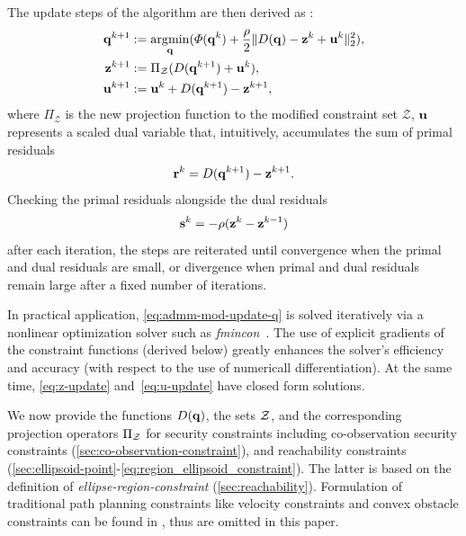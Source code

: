 \documentclass[10pt,twocolumn,twoside]{IEEEtran}
\newcommand{\news}{\color{blue}}
\begin{document}
The update steps of the algorithm are then derived as \cite{Boyd2011}:
\begin{subequations}\label{eq:ADMMupdate}
	\begin{align}
		\mathbf{q}^{k+1}&:=\operatorname*{\arg\!\min}_{\mathbf{q}}(\varPhi(\mathbf{q}^k) +\frac{\rho}{2}\lVert D(\mathbf{q})-\mathbf{z}^k+\mathbf{u}^k\rVert_2^2),\label{eq:admm-mod-update-q}\\
		\mathbf{z}^{k+1}&:=\Pi_\mathcal{Z}(D(\mathbf{q}^{k+1})+\mathbf{u}^k), \label{eq:z-update} \\
		\mathbf{u}^{k+1}&:=\mathbf{u}^k+D(\mathbf{q}^{k+1})-\mathbf{z}^{k+1}, \label{eq:u-update}
	\end{align}
\end{subequations}
where $\Pi_\mathcal{Z}$ is the new projection function to the modified constraint set $\mathcal{Z}$, $\mathbf{u}$ represents a scaled dual variable that, intuitively, accumulates the sum of primal residuals
\begin{equation}\label{eq:primal-residual}
	\mathbf{r}^{k}=D(\mathbf{q}^{k+1})-\mathbf{z}^{k+1}.
\end{equation}
Checking the primal residuals alongside the dual residuals 
\begin{equation}\label{eq:dual-residual}
	\mathbf{s}^{k}=-\rho(\mathbf{z}^{k}-\mathbf{z}^{k-1})
\end{equation}
after each iteration, the steps are reiterated until convergence when the primal and dual residuals are small, or divergence when primal and dual residuals remain large after a fixed number of iterations.
{\news
\begin{remark}
In practical application, \eqref{eq:admm-mod-update-q} is solved iteratively via a nonlinear optimization solver such as \emph{fmincon}~\cite{MATLAB:fmincon}. The use of explicit gradients of the constraint functions (derived below) greatly enhances the solver's efficiency and accuracy (with respect to the use of numericall differentiation). At the same time, \eqref{eq:z-update} and~\eqref{eq:u-update} have closed form solutions.
\end{remark}
}

We now provide the functions $D(\mathbf{q})$, the sets $\mathcal{Z}$, and the corresponding projection operators $\Pi_{\mathcal{Z}}$ for security constraints including co-observation security constraints (\cref{sec:co-observation-constraint}), and reachability constraints (\cref{sec:ellipsoid-point}-\cref{eq:region_ellipsoid_constraint}). The latter is based on the definition of \emph{ellipse-region-constraint} (\cref{sec:reachability}).
Formulation of traditional path planning constraints like velocity constraints and convex obstacle constraints can be found in \cite{yang2020multi}, thus are omitted in this paper.
\end{document}
